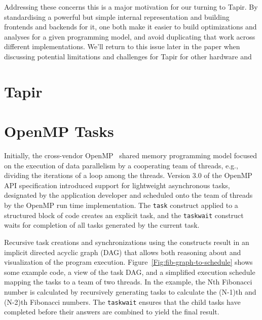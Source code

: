 \documentclass[sigconf]{acmart}
\begin{document}
Addressing these concerns this is a major motivation for our turning to Tapir.
By standardising a powerful but simple internal representation and building
frontends and backends for it, one both make it easier to build optimizations
and analyses for a given programming model, and avoid duplicating that work
across different implementations. We'll return to this issue later in the paper
when discussing potential limitations and challenges for Tapir for other
hardware and 

\section{Tapir} \label{Sec:Tapir}

\section{OpenMP Tasks} \label{Sec:OpenMP}

Initially, the cross-vendor OpenMP~\cite{spec} shared memory programming model 
focused on the execution of data parallelism by a cooperating team of threads, 
e.g., dividing the iterations of a loop among the threads. Version 3.0 of the 
OpenMP API specification introduced support for lightweight asynchronous tasks, 
designated by the application developer and scheduled onto the team of threads 
by the OpenMP run time implementation.  The \texttt{task} construct applied to 
a structured block of code creates an explicit task, and the \texttt{taskwait} 
construct waits for completion of all tasks generated by the current task.

Recursive task creations and synchronizations using the constructs result in 
an implicit directed acyclic graph (DAG) that allows both reasoning about and 
visualization of the program execution.  Figure~\ref{Fig:fib-graph-to-schedule}
shows some example code, a view of the task DAG, and a simplified execution 
schedule mapping the tasks to a team of two threads.  In the example, the Nth 
Fibonacci number is calculated by recursively generating tasks to calculate 
the (N-1)th and (N-2)th Fibonacci numbers.  The \texttt{taskwait} ensures that 
the child tasks have completed before their answers are combined to yield the 
final result.
\end{document}
